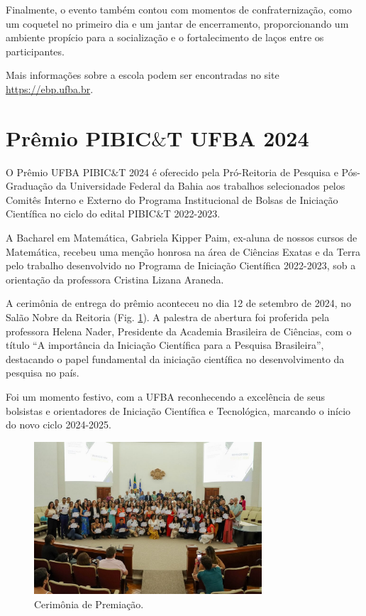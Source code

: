 \documentclass{hipatia}
\begin{document}
Finalmente, o evento também contou com momentos de confraternização, como um coquetel no primeiro dia e um jantar de encerramento, proporcionando um ambiente propício para a socialização e o fortalecimento de laços entre os participantes.

Mais informações sobre a escola podem ser encontradas no site \href{https://ebp.ufba.br/}{https://ebp.ufba.br}.



\section{Prêmio PIBIC$\&$T UFBA 2024} %



O Prêmio UFBA PIBIC$\&$T 2024 é oferecido pela Pró-Reitoria de Pesquisa e Pós-Graduação da  Universidade Federal da Bahia aos trabalhos selecionados pelos Comitês Interno e Externo do Programa Institucional de Bolsas de Iniciação Científica no ciclo do edital PIBIC$\&$T 2022-2023.

A Bacharel em Matemática,  Gabriela Kipper Paim, ex-aluna de nossos cursos de Matemática, recebeu uma  menção honrosa na área de Ciências Exatas e da Terra pelo trabalho desenvolvido no Programa de Iniciação Científica 2022-2023, sob a orientação da professora Cristina Lizana Araneda.

A cerimônia de entrega do prêmio aconteceu no dia 12 de setembro de 2024, no Salão Nobre da Reitoria (Fig. \ref{premio}).  A palestra de abertura foi proferida pela professora Helena Nader, Presidente da Academia Brasileira de Ciências, com o título ``A importância da Iniciação Científica para a Pesquisa Brasileira'', destacando o papel fundamental da iniciação científica no desenvolvimento da pesquisa no país.

 Foi um momento festivo, com a UFBA reconhecendo a excelência de seus bolsistas e orientadores de Iniciação Científica e Tecnológica, marcando o início do novo ciclo 2024-2025.


\begin{figure}[htb]
    \centering
    \includegraphics[width=8.5cm]{PIBIC3.jpg}
    \caption{Cerimônia de Premiação.}
 \label{premio}
\end{figure}
\end{document}
